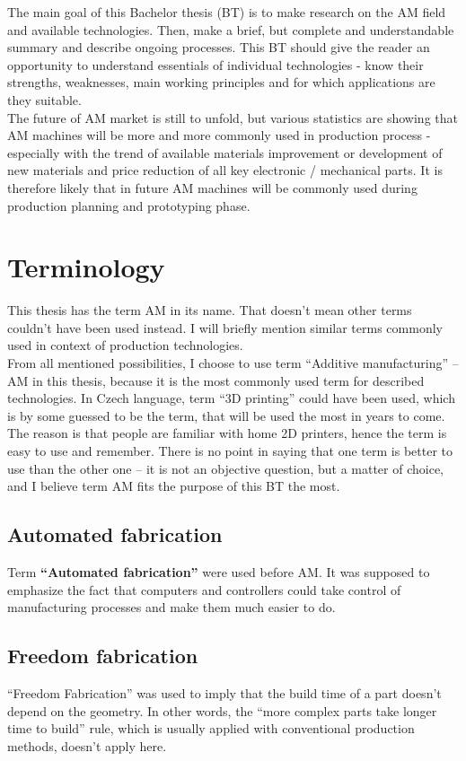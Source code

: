 \documentclass[a4paper]{report}
\begin{document}
The main goal of this Bachelor thesis (BT) is to make research on the AM field and available technologies. Then, make a brief, but complete and understandable summary and describe ongoing processes. This BT should give the reader an opportunity to understand essentials of individual technologies - know their strengths, weaknesses, main working principles and for which applications are they suitable.\\
The future of AM market is still to unfold, but various statistics are showing that AM machines will be more and more commonly used in production process - especially with the trend of available materials improvement or development of new materials and price reduction of all key electronic / mechanical parts. It is therefore likely that in future AM machines will be commonly used during production planning and prototyping phase.

\newpage
\section{Terminology}
This thesis has the term AM in its name. That doesn't mean other terms couldn't have been used instead. I will briefly mention similar terms commonly used in context of production technologies.\\
From all mentioned possibilities, I choose to use term “Additive manufacturing” – AM in this thesis, because it is the most commonly used term for described technologies. In Czech language, term “3D printing” could have been used, which is by some guessed to be the term, that will be used the most in years to come. The reason is that people are familiar with home 2D printers, hence the term is easy to use and remember. There is no point in saying that one term is better to use than the other one – it is not an objective question, but a matter of choice, and I believe term AM fits the purpose of this BT the most.
\subsection{Automated fabrication}
Term \textbf{“Automated fabrication”} were used before AM. It was supposed to emphasize the fact that computers and controllers could take control of manufacturing processes and make them much easier to do.
\subsection{Freedom fabrication}
“Freedom Fabrication” was used to imply that the build time of a part doesn’t depend on the geometry. In other words, the “more complex parts take longer time to build” rule, which is usually applied with conventional production methods, doesn’t apply here.
\end{document}
